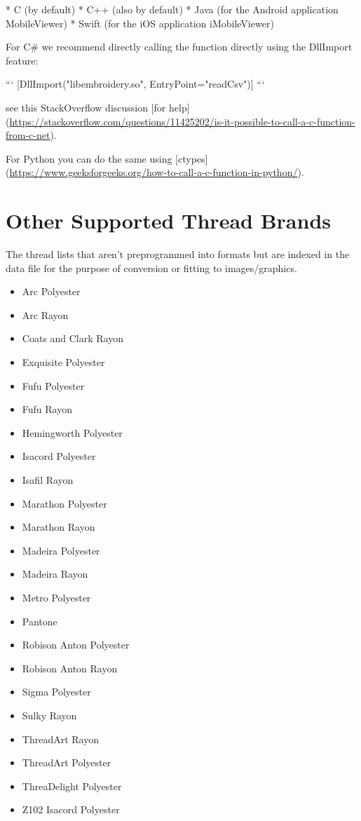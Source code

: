 \documentclass{report}
\begin{document}
  * C (by default)
  * C++ (also by default)
  * Java (for the Android application MobileViewer)
  * Swift (for the iOS application iMobileViewer)

For C\# we recommend directly calling the function directly
using the DllImport feature:

```
[DllImport("libembroidery.so", EntryPoint="readCsv")]
```

see this StackOverflow discussion [for help](\url{https://stackoverflow.com/questions/11425202/is-it-possible-to-call-a-c-function-from-c-net}).

For Python you can do the same using [ctypes](\url{https://www.geeksforgeeks.org/how-to-call-a-c-function-in-python/}).

\section{Other Supported Thread Brands}

The thread lists that aren't preprogrammed into formats but
are indexed in the data file for the purpose of conversion
or fitting to images/graphics.

\begin{itemize}
\item Arc Polyester
\item Arc Rayon
\item Coats and Clark Rayon
\item Exquisite Polyester
\item Fufu Polyester
\item Fufu Rayon
\item Hemingworth Polyester
\item Isacord Polyester
\item Isafil Rayon
\item Marathon Polyester
\item Marathon Rayon
\item Madeira Polyester
\item Madeira Rayon
\item Metro Polyester
\item Pantone
\item Robison Anton Polyester
\item Robison Anton Rayon
\item Sigma Polyester
\item Sulky Rayon
\item ThreadArt Rayon
\item ThreadArt Polyester
\item ThreaDelight Polyester
\item Z102 Isacord Polyester
\end{itemize}
\end{document}
